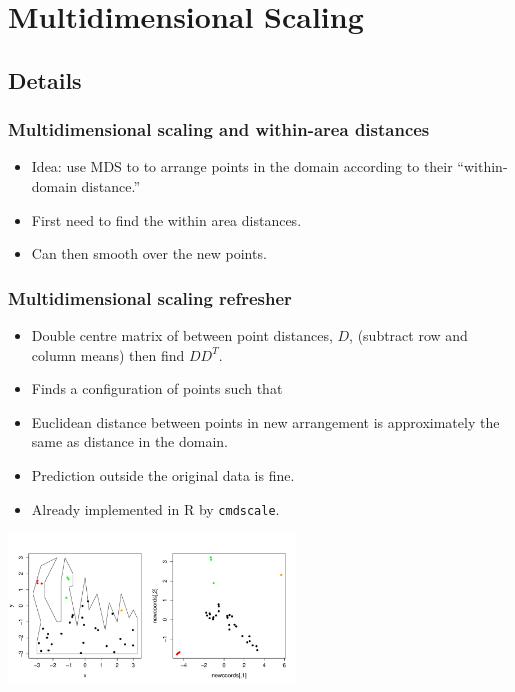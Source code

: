 \documentclass[ignorenonframetext]{beamer} %
\newcommand{\bi}{\begin{itemize}}
\newcommand{\ei}{\end{itemize}}
\begin{document}
\section{Multidimensional Scaling}

\subsection{Details}

\begin{frame}
	\frametitle{Multidimensional scaling and within-area distances}
       \bi
         \item Idea: use MDS to to arrange points in the domain according to their ``within-domain distance.''
         \item First need to find the within area distances.
         \item Can then smooth over the new points.

        \ei
\end{frame}

\begin{frame}
	\frametitle{Multidimensional scaling refresher}
       \bi
         \item Double centre matrix of between point distances, $D$, (subtract row and column means) then find $DD^T$.
         \item Finds a configuration of points such that \item Euclidean distance between points in new arrangement is approximately the same as distance in the domain.
         \item Prediction outside the original data is fine.
         \item Already implemented in \textsf{R} by \texttt{cmdscale}.
        \ei
            \centering
              \includegraphics[width=3in]{figs/wt2-pco-example.pdf}\\
        
\end{frame}
\end{document}
